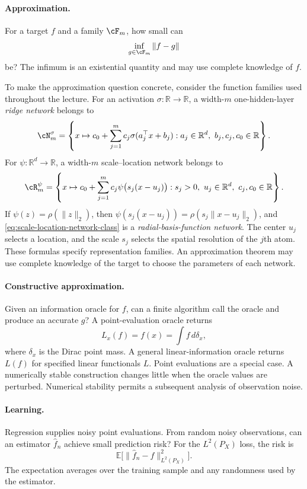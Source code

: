 \documentclass[11pt,twoside]{article}
\newcommand{\E}{\mathbb E}
\newcommand{\R}{\mathbb R}
\theoremstyle{definition}
\theoremstyle{remark}
\begin{document}
\paragraph{Approximation.}
For a target $f$ and a family $\cF_m$, how small can
\begin{equation}
 \inf_{g\in\cF_m}\|f-g\|
 \label{eq:approximation-error}
\end{equation}
be? The infimum is an existential quantity and may use complete knowledge of
$f$.

To make the approximation question concrete, consider the function families
used throughout the lecture. For an activation $\sigma:\R\to\R$, a width-$m$
one-hidden-layer \emph{ridge network} belongs to
\begin{equation}
 \cN_m^\sigma
 =\left\{x\mapsto c_0+\sum_{j=1}^m
 c_j\sigma(a_j^\top x+b_j):
 a_j\in\R^d,\ b_j,c_j,c_0\in\R\right\}.
 \label{eq:ridge-network-class}
\end{equation}
For $\psi:\R^d\to\R$, a width-$m$ scale--location network belongs to
\begin{equation}
 \cR_m^\psi
 =\left\{x\mapsto c_0+\sum_{j=1}^m
 c_j\psi\bigl(s_j(x-u_j)\bigr):
 s_j>0,\ u_j\in\R^d,\ c_j,c_0\in\R\right\}.
 \label{eq:scale-location-network-class}
\end{equation}
If $\psi(z)=\rho(\|z\|_2)$, then
$\psi(s_j(x-u_j))=\rho(s_j\|x-u_j\|_2)$, and
\cref{eq:scale-location-network-class} is a \emph{radial-basis-function
network}. The center $u_j$ selects a location, and the scale $s_j$ selects the
spatial resolution of the $j$th atom. These formulas specify representation
families. An approximation theorem may use complete knowledge of the target
to choose the parameters of each network.

\paragraph{Constructive approximation.}
Given an information oracle for $f$, can a finite algorithm call the oracle
and produce an accurate $g$? A point-evaluation oracle returns
\[
 L_x(f)=f(x)=\int f\,d\delta_x,
\]
where $\delta_x$ is the Dirac point mass. A general linear-information oracle
returns $L(f)$ for specified linear functionals $L$. Point evaluations are a
special case. A numerically stable construction changes little when the oracle
values are perturbed. Numerical stability permits a subsequent analysis of
observation noise.

\paragraph{Learning.}
Regression supplies noisy point evaluations. From random noisy observations,
can an estimator $\widehat f_n$ achieve small prediction risk? For the
$L^2(P_X)$ loss, the risk is
\begin{equation}
 \E\bigl[\|\widehat f_n-f\|_{L^2(P_X)}^2\bigr].
 \label{eq:learning-risk}
\end{equation}
The expectation averages over the training sample and any randomness used by
the estimator.
\end{document}
